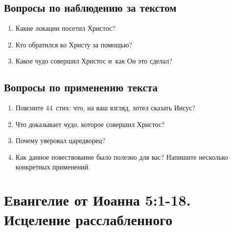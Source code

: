 \documentclass[a4paper,12pt]{article}
\begin{document}
\subsection*{Вопросы по наблюдению за текстом}
\begin{enumerate}
    \item Какие локации посетил Христос? 
    
    \myline
    
    \myline
    \item Кто обратился ко Христу за помощью? 
    
    \myline
    
    \myline
    \item Какое чудо совершил Христос и~как Он это сделал? 
    
    \myline
    
    \myline
\end{enumerate}

\subsection*{Вопросы по применению текста} 
\begin{enumerate}
    \item Поясните 44~стих: что, на ваш взгляд, хотел сказать Иисус? 
    
    \myline
    
    \myline
    \item Что доказывает чудо, которое совершил Христос? 
    
    \myline
    
    \myline
    \item Почему уверовал царедворец? 
    
    \myline
    
    \myline
    \item Как данное повествование было полезно для вас? Напишите несколько конкретных применений.
    
    \myline
    
    \myline
\end{enumerate}



\section{Евангелие от Иоанна 5:1-18. Исцеление расслабленного}
\end{document}
